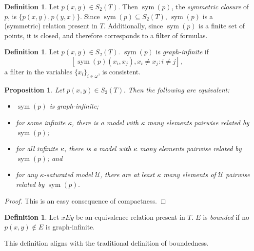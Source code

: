 \documentclass[letterpaper,twoside]{article}
\newtheorem{proposition}[theorem]{Proposition}
\theoremstyle{definition}
\newtheorem{definition}[theorem]{Definition}
\theoremstyle{remark}
\newcommand{\defterm}[1]{\emph{#1}}
\DeclareMathOperator{\sym}{sym}
\begin{document}
\begin{definition}
  Let \(p(x,y) \in S_2(T)\).  Then \(\sym(p)\), the \defterm{symmetric
    closure} of \(p\), is \(\{p(x,y), p(y,x)\}\).  Since \(\sym(p)
  \subseteq S_2(T)\), \(\sym(p)\) is a (symmetric) relation present in
  \(T\).  Additionally, since \(\sym(p)\) is a finite set of points,
  it is closed, and therefore corresponds to a filter of formulas.
\end{definition}

\begin{definition}
  Let \(p(x,y) \in S_2(T)\).  \(\sym(p)\) is \defterm{graph-infinite}
  if \[[\sym(p)(x_i,x_j), x_i \neq x_j : i \neq j],\] a filter in the
  variables \(\{x_i\}_{i \in \omega}\), is consistent.
\end{definition}

\begin{proposition}\label{proposition-graphinfinite}
  Let \(p(x,y) \in S_2(T)\).  Then the following are equivalent:
  \begin{itemize}
  \item \(\sym(p)\) is graph-infinite;
  \item for some infinite \(\kappa\), there is a model with \(\kappa\)
    many elements pairwise related by \(\sym(p)\);
  \item for all infinite \(\kappa\), there is a model with \(\kappa\)
    many elements pairwise related by \(\sym(p)\); and
  \item for any \(\kappa\)-saturated model \(\mathcal{U}\), there are
    at least \(\kappa\) many elements of \(\mathcal{U}\) pairwise
    related by \(\sym(p)\).
  \end{itemize}
\end{proposition}
\begin{proof}
  This is an easy consequence of compactness.
\end{proof}

\begin{definition}
  Let \(xEy\) be an equivalence relation present in \(T\).  \(E\) is
  \defterm{bounded} if no \(p(x,y) \notin E\) is graph-infinite.
\end{definition}

This definition aligns with the traditional definition of boundedness.
\end{document}
